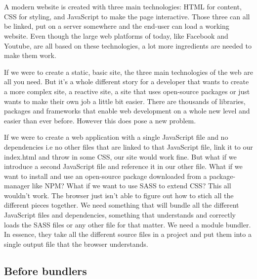 \chapter{}
\label{ch:stand-van-zaken}



A modern website is created with three main technologies: HTML for content, CSS for styling, and JavaScript to make the page interactive. Those three can all be linked, put on a server somewhere and the end-user can load a working website. Even though the large web platforms of today, like Facebook and Youtube, are all based on these technologies, a lot more ingredients are needed to make them work.

If we were to create a static, basic site, the three main technologies of the web are all you need. But it’s a whole different story for a developer that wants to create a more complex site, a reactive site, a site that uses open-source packages or just wants to make their own job a little bit easier. There are thousands of libraries, packages and frameworks that enable web development on a whole new level and easier than ever before. However this does pose a new problem. 

If we were to create a web application with a single JavaScript file and no dependencies i.e no other files that are linked to that JavaScript file, link it to our index.html and throw in some CSS, our site would work fine. But what if we introduce a second JavaScript file and reference it in our other file. What if we want to install and use an open-source package downloaded from a package-manager like NPM? What if we want to use SASS to extend CSS? This all wouldn’t work. The browser just isn’t able to figure out how to stich all the different pieces together.
We need something that will bundle all the different JavaScript files and dependencies, something that understands and correctly loads the SASS files or any other file for that matter. We need a module bundler. In essence, they take all the different source files in a project and put them into a single output file that the browser understands. 

\section{Before bundlers}

